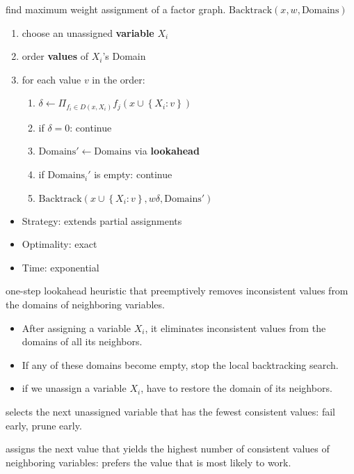  find maximum weight assignment of a factor graph.
\textbf{$\text{Backtrack}(x, w, \text{Domains})$}
\begin{enumerate}
    \item choose an unassigned \textbf{variable} $X_i$ 
    \item order \textbf{values} of $X_i$'s Domain 
    \item for each value $v$ in the order:\begin{enumerate}
        \item $\delta \leftarrow \Pi_{f_i\in D(x,X_i)}f_j(x\cup\left\{X_i:v\right\})$
        \item if $\delta = 0$: continue
        \item $\text{Domains}' \leftarrow \text{Domains}$ via \textbf{lookahead} 
        \item if $\text{Domains}_i'$ is empty: continue
        \item \textbf{$\text{Backtrack}(x \cup \left\{X_i:v\right\}, w\delta, \text{Domains}')$}
    \end{enumerate}
\end{enumerate}
\begin{itemize}
    \item Strategy: extends partial assignments
    \item Optimality: exact
    \item Time: exponential
\end{itemize}

 one-step lookahead heuristic that preemptively removes
inconsistent values from the domains of neighboring variables.
\begin{itemize}
    \item After assigning a variable $X_i$, it eliminates inconsistent values from the domains of all its neighbors.
    \item If any of these domains become empty, stop the local backtracking search.
    \item if we unassign a variable $X_i$, have to restore the domain of its neighbors.
\end{itemize}

 selects the next unassigned
variable that has the fewest consistent values: fail early, prune early.

 assigns the next value that yields
the highest number of consistent values of neighboring variables: prefers the
value that is most likely to work. 

